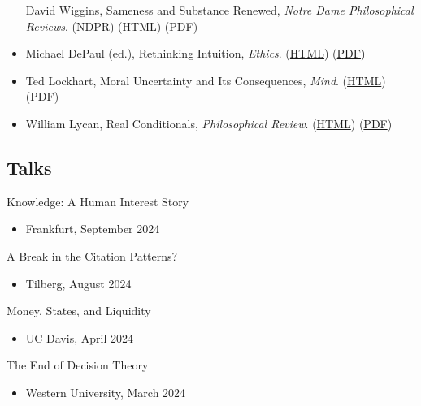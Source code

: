 \documentclass[
  10pt,
  letterpaper,
  DIV=11,
  numbers=noendperiod,
  twoside]{scrartcl}
\providecommand{\tightlist}{%
  \setlength{\itemsep}{0pt}\setlength{\parskip}{0pt}}\usepackage{longtable,booktabs,array}
\begin{document}
\begin{itemize}
  David Wiggins, Sameness and Substance Renewed, \emph{Notre Dame
  Philosophical Reviews}.
  (\href{http://ndpr.nd.edu/review.cfm?id=1090}{NDPR})
  (\href{./posts/review-sameness/review-of-sameness-and-substance-renewed.html}{HTML})
  (\href{./posts/review-sameness/Review\%20of\%20Sameness\%20and\%20Substance\%20Renewed.pdf}{PDF})
\item
  Michael DePaul (ed.), Rethinking Intuition, \emph{Ethics}.
  (\href{./posts/review-rethinking-intuition/review-rethinking.qmd}{HTML})
  (\href{./posts/review-rethinking-intuition/Review\%20of\%20Rethinking\%20Intuition.pdf}{PDF})
\item
  Ted Lockhart, Moral Uncertainty and Its Consequences, \emph{Mind}.
  (\href{./posts/review-moral-uncertainty/review-moral-uncertainty.html}{HTML})
  (\href{./posts/review-moral-uncertainty/Review\%20of\%20Moral\%20Uncertainty\%20and\%20Its\%20Consequences.pdf}{PDF})
\item
  William Lycan, Real Conditionals, \emph{Philosophical Review}.
  (\href{./posts/review-real-cond/review-of-real-conditionals.html}{HTML})
  (\href{./posts/review-real-cond/Review\%20of\%20Real\%20Conditionals.pdf}{PDF})
\end{itemize}

\subsection{Talks}\label{talks}

Knowledge: A Human Interest Story

\begin{itemize}
\tightlist
\item
  Frankfurt, September 2024
\end{itemize}

A Break in the Citation Patterns?

\begin{itemize}
\tightlist
\item
  Tilberg, August 2024
\end{itemize}

Money, States, and Liquidity

\begin{itemize}
\tightlist
\item
  UC Davis, April 2024
\end{itemize}

The End of Decision Theory

\begin{itemize}
\tightlist
\item
  Western University, March 2024
\end{itemize}
\end{document}
